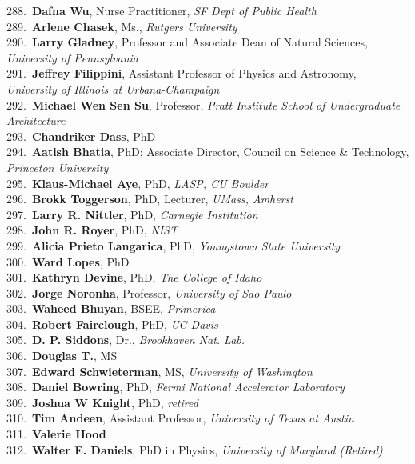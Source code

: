 288.~{\bf Dafna Wu}, Nurse Practitioner, {\sl SF Dept of Public Health} \\
289.~{\bf Arlene Chasek}, Ms., {\sl Rutgers University} \\
290.~{\bf Larry Gladney}, Professor and Associate Dean of Natural Sciences, {\sl University of Pennsylvania} \\
291.~{\bf Jeffrey Filippini}, Assistant Professor of Physics and Astronomy, {\sl University of Illinois at Urbana-Champaign} \\
292.~{\bf Michael Wen Sen Su}, Professor, {\sl Pratt Institute School of Undergraduate Architecture} \\
293.~{\bf Chandriker Dass}, PhD \\
294.~{\bf Aatish Bhatia}, PhD; Associate Director, Council on Science \& Technology, {\sl Princeton University} \\
295.~{\bf Klaus-Michael Aye}, PhD, {\sl LASP, CU Boulder} \\
296.~{\bf Brokk Toggerson}, PhD, Lecturer, {\sl UMass, Amherst} \\
297.~{\bf Larry R. Nittler}, PhD, {\sl Carnegie Institution} \\
298.~{\bf John R. Royer}, PhD, {\sl NIST} \\
299.~{\bf Alicia Prieto Langarica}, PhD, {\sl Youngstown State University} \\
300.~{\bf Ward Lopes}, PhD \\
301.~{\bf Kathryn Devine}, PhD, {\sl The College of Idaho} \\
302.~{\bf Jorge Noronha}, Professor, {\sl University of Sao Paulo} \\
303.~{\bf Waheed Bhuyan}, BSEE, {\sl Primerica } \\
304.~{\bf Robert Fairclough}, PhD, {\sl UC Davis} \\
305.~{\bf D. P. Siddons}, Dr., {\sl Brookhaven Nat. Lab.} \\
306.~{\bf Douglas T.}, MS \\
307.~{\bf Edward Schwieterman}, MS, {\sl University of Washington} \\
308.~{\bf Daniel Bowring}, PhD, {\sl Fermi National Accelerator Laboratory} \\
309.~{\bf Joshua W Knight}, PhD, {\sl retired} \\
310.~{\bf Tim Andeen}, Assistant Professor, {\sl University of Texas at Austin} \\
311.~{\bf Valerie Hood} \\
312.~{\bf Walter E. Daniels}, PhD in Physics, {\sl University of Maryland (Retired)} \\
